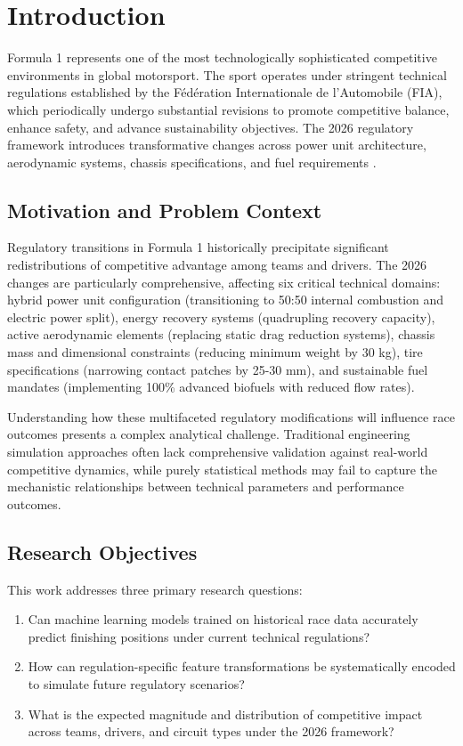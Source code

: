\documentclass[conference]{IEEEtran}
\begin{document}
\section{Introduction}

Formula 1 represents one of the most technologically sophisticated competitive environments in global motorsport. The sport operates under stringent technical regulations established by the F\'ed\'eration Internationale de l'Automobile (FIA), which periodically undergo substantial revisions to promote competitive balance, enhance safety, and advance sustainability objectives. The 2026 regulatory framework introduces transformative changes across power unit architecture, aerodynamic systems, chassis specifications, and fuel requirements \cite{fia2026regs}.

\subsection{Motivation and Problem Context}

Regulatory transitions in Formula 1 historically precipitate significant redistributions of competitive advantage among teams and drivers. The 2026 changes are particularly comprehensive, affecting six critical technical domains: hybrid power unit configuration (transitioning to 50:50 internal combustion and electric power split), energy recovery systems (quadrupling recovery capacity), active aerodynamic elements (replacing static drag reduction systems), chassis mass and dimensional constraints (reducing minimum weight by 30 kg), tire specifications (narrowing contact patches by 25-30 mm), and sustainable fuel mandates (implementing 100\% advanced biofuels with reduced flow rates).

Understanding how these multifaceted regulatory modifications will influence race outcomes presents a complex analytical challenge. Traditional engineering simulation approaches often lack comprehensive validation against real-world competitive dynamics, while purely statistical methods may fail to capture the mechanistic relationships between technical parameters and performance outcomes.

\subsection{Research Objectives}

This work addresses three primary research questions:

\begin{enumerate}
    \item Can machine learning models trained on historical race data accurately predict finishing positions under current technical regulations?
    \item How can regulation-specific feature transformations be systematically encoded to simulate future regulatory scenarios?
    \item What is the expected magnitude and distribution of competitive impact across teams, drivers, and circuit types under the 2026 framework?
\end{enumerate}
\end{document}
